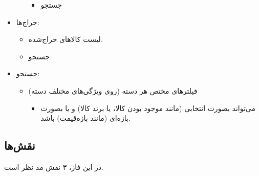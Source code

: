 \documentclass[]{article}
\begin{document}
\begin{itemize}
\begin{itemize}
\begin{itemize}[label={$\blacksquare$}]
\item
جستجو

\end{itemize}
\end{itemize}

\item
حراج‌ها:

\begin{itemize}
\item
لیست کالاهای حراج‌شده.

\item
جستجو
\end{itemize}

\item
جستجو:

\begin{itemize}
\item
فیلترهای مختص هر دسته (روی ویژگی‌های مختلف دسته)

\begin{itemize}[label={$\blacksquare$}]
\item
می‌تواند بصورت انتخابی (مانند موجود بودن کالا، یا برند کالا) و یا بصورت بازه‌ای (مانند بازه‌قیمت) باشد.
\end{itemize}
\end{itemize}

\end{itemize}

\newpage

\subsection*{{\titr نقش‌ها}}

در این فاز، ۳ نقش مد نظر است.
\end{document}
